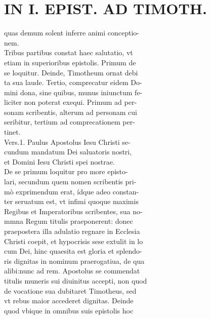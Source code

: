 \documentclass{article}
\begin{document}
\begin{pages}
\textbf{}
\section*{IN I. EPIST. AD TIMOTH. \\
                }
quas demum solent inferre animi conceptio- \\
                nem. \\
                Tribus partibus constat haec salutatio, vt \\
                etiam in superioribus epistolis. Primum de \\
                se loquitur. Deinde, Timotheum ornat debi \\
                ta sua laude. Tertio, comprecatur eidem Do- \\
                mini dona, sine quibus, munus iniunctum fe- \\
                liciter non poterat exequi. Primum ad per- \\
                sonam scribentis, alterum ad personam cui \\
                seribitur, tertium ad comprecationem per- \\
                tinet. \\
                Vers.1. Paulus Apostolus Iesu Christi se- \\
                cundum mandatum Dei saluatoris nostri, \\
                et Domini Iesu Christi spei nostrae. \\
                De se primum loquitur pro more episto- \\
                lari, secundum quem nomen scribentis pri- \\
                mò exprimendum erat, ídque adeo constan- \\
                ter seruatum est, vt infimi quoque maximis \\
                Regibus et Imperatoribus scribentes, sua no- \\
                mmna Regum titulis praeponerent: donec \\
                praepostera illa adulatio regnare in Ecclesia \\
                Christi coepit, et hypocrisis sese extulit in lo \\
                cum Dei, hinc quaesita est gloria et splendo- \\
                ris dignitas in nominum praerogatiua, de qua \\
                alibi:nunc ad rem. Apostolus se commendat \\
                titulis muneris sui diuinitus accepti, non quod \\
                de vocatione sua dubitaret Timotheus, sed \\
                vt rebus maior accederet dignitas. Deinde \\
                quod vbique in omnibus suis epistolis hoc \\
                

\end{pages}
\end{document}
